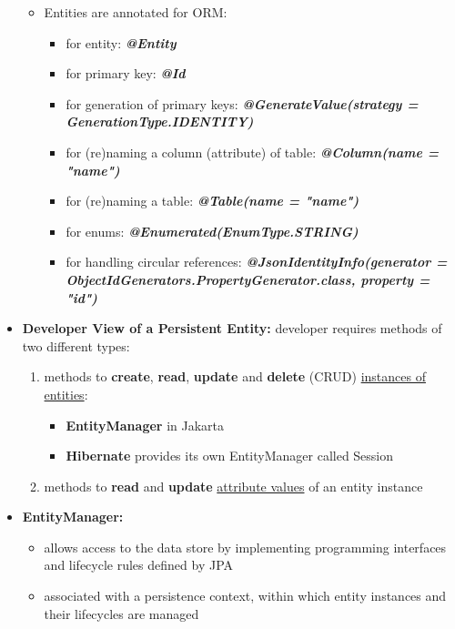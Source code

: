 \documentclass[ieeetran]{article}
\begin{document}
\begin{itemize}
\begin{itemize}
	\item Entities are annotated for ORM:
		\begin{itemize}
		  \item for entity: \textit{\textbf{@Entity}}
		\item for primary key: \textit{\textbf{@Id}}
			\item for generation of primary keys: \textit{\textbf{@GenerateValue(strategy = GenerationType.IDENTITY)}}
				\item for (re)naming a column (attribute) of table: \textit{\textbf{@Column(name = "name")}}
				\item for (re)naming a table: \textit{\textbf{@Table(name = "name")}}
				\item for enums: \textit{\textbf{@Enumerated(EnumType.STRING)}}
				\item for handling circular references: \textit{\textbf{@JsonIdentityInfo(generator = ObjectIdGenerators.PropertyGenerator.class, property = "id")}}
		\end{itemize}
	\end{itemize}


\item \textbf{Developer View of a Persistent Entity:} developer requires methods of two different types:
	\begin{enumerate}
	  \item methods to \textbf{create}, \textbf{read}, \textbf{update} and \textbf{delete} (CRUD) \underline{instances of} \underline{entities}:
		  \begin{itemize}
		    \item \textbf{EntityManager} in Jakarta
		\item \textbf{Hibernate} provides its own EntityManager called Session
		  \end{itemize}

\item methods to \textbf{read} and \textbf{update} \underline{attribute values} of an entity instance
	\end{enumerate}

\item \textbf{EntityManager:}
	\begin{itemize}
	  \item allows access to the data store by implementing programming interfaces and lifecycle rules defined by JPA
	\item associated with a persistence context, within which entity instances and their lifecycles are managed
	\end{itemize}


\end{itemize}
\end{document}
